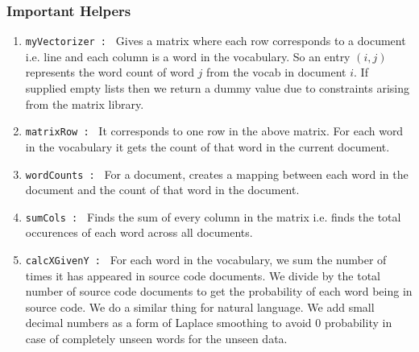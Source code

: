 \documentclass[12pt]{scrreprt}
\newcommand{\ttt}[1]{\texttt{#1}}
\begin{document}
\subsubsection{Important Helpers}
\begin{enumerate}
    \item \ttt{myVectorizer : } Gives a matrix where each row corresponds to a document i.e. line and each column is a word in the vocabulary. So an entry $(i,j)$ represents the word count of word $j$ from the vocab in document $i$. If supplied empty lists then we return a dummy value due to constraints arising from the matrix library.
    \item \ttt{matrixRow : } It corresponds to one row in the above matrix. For each word in the vocabulary it gets the count of that word in the current document.
    \item \ttt{wordCounts : } For a document, creates a mapping between each word in the document and the count of that word in the document.
    \item \ttt{sumCols : } Finds the sum of every column in the matrix i.e. finds the total occurences of each word across all documents.
    \item \ttt{calcXGivenY : } For each word in the vocabulary, we sum the number of times it has appeared in source code documents. We divide by the total number of source code documents to get the probability of each word being in source code. We do a similar thing for natural language. We add small decimal numbers as a form of Laplace smoothing to avoid 0 probability in case of completely unseen words for the unseen data.
\end{enumerate}
\end{document}

